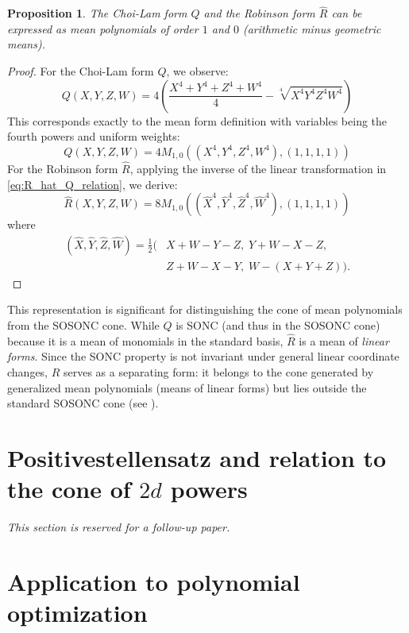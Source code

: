 \documentclass{article}
\newtheorem{proposition}{Proposition}
\begin{document}
\begin{proposition}\label{prop:ChoiLamRobinson}
The Choi-Lam form $Q$ and the Robinson form $\hat{R}$ can be expressed as mean polynomials of order $1$ and $0$ 
(arithmetic minus geometric means).
\end{proposition}

\begin{proof}
For the Choi-Lam form $Q$, we observe:
\[
    Q(X, Y, Z, W) = 4 \left( \frac{X^4 + Y^4 + Z^4 + W^4}{4} - \sqrt[4]{X^4 Y^4 Z^4 W^4} \right)
\]
This corresponds exactly to the mean form definition with variables being the fourth powers and uniform weights:
\[
    Q(X, Y, Z, W) = 4 M_{1,0}((X^4, Y^4, Z^4, W^4), (1, 1, 1, 1))
\]
For the Robinson form $\hat{R}$, applying the inverse of the linear transformation in \eqref{eq:R_hat_Q_relation}, 
we derive:
\[
    \hat{R}(X,Y,Z,W) = 8 M_{1,0}((\hat{X}^4, \hat{Y}^4, \hat{Z}^4, \hat{W}^4), (1,1,1,1))
\]
where 
\[
    \begin{aligned}
        (\hat{X}, \hat{Y}, \hat{Z}, \hat{W}) = \frac{1}{2}(&X+W-Y-Z, \; Y+W-X-Z, \\
        &Z+W-X-Y, \; W-(X+Y+Z)).
    \end{aligned}
\]
\end{proof}

This representation is significant for distinguishing the cone of mean polynomials from the SOSONC cone. While $Q$ is 
SONC (and thus in the SOSONC cone) because it is a mean of monomials in the standard basis, $\hat{R}$ is a mean of 
\emph{linear forms}. Since the SONC property is not invariant under general linear coordinate changes, $\hat{R}$ 
serves as a separating form: it belongs to the cone generated by generalized mean polynomials (means of linear forms) 
but lies outside the standard SOSONC cone (see \cite[page 31 and Lemma 4.2.5, page 107]{MSc01}).


\section{\texorpdfstring{Positivestellensatz and relation to the cone of $2d$ powers}{Positivestellensatz and relation to the cone of 2d powers}}
\label{s06}

\emph{This section is reserved for a follow-up paper.}

\section{Application to polynomial optimization}
\label{s07}
\end{document}
